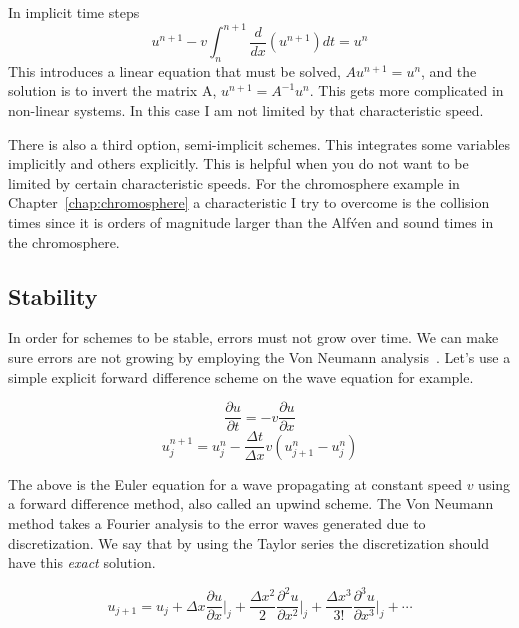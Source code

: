 \documentclass[12pt,upcase]{umlthesis}
\begin{document}
In implicit time steps
\begin{equation}\label{eq:implicit}
	u^{n+1} - v\int^{n+1}_n \frac{d}{dx}(u^{n+1}) dt = u^n 
\end{equation}
This introduces a linear equation that must be solved, $Au^{n+1} = u^n$, and the solution is to invert the matrix A, $u^{n+1} = A^{-1} u^n$. This gets more complicated in non-linear systems. In this case I am not limited by that characteristic speed.

There is also a third option, semi-implicit schemes. This integrates some variables implicitly and others explicitly. This is helpful when you do not want to be limited by certain characteristic speeds. For the chromosphere example in Chapter~\ref{chap:chromosphere} a characteristic I try to overcome is the collision times since it is orders of magnitude larger than the Alf\'ven and sound times in the chromosphere.

\subsection{Stability}\label{sec:stability}

In order for schemes to be stable, errors must not grow over time. We can make sure errors are not growing by employing the Von Neumann analysis~\citep{vonneumann1950}. Let's use a simple explicit forward difference scheme on the wave equation for example.
 
\begin{equation}
	\frac{\partial u}{\partial t} = -v\frac{\partial u}{\partial x}
\end{equation}
\begin{equation}\label{eq:upwind}
	u^{n+1}_j = u^n_j - \frac{\Delta t}{\Delta x}v(u^n_{j+1}-u^n_{j})
\end{equation}

The above is the Euler equation for a wave propagating at constant speed $v$ using a forward difference method, also called an upwind scheme. The Von Neumann method takes a Fourier analysis to the error waves generated due to discretization. We say that by using the Taylor series the discretization should have this {\it exact\/} solution.

\begin{equation}
	u_{j+1} = u_j + \Delta x {\frac{\partial u}{\partial x}}\rvert_j + \frac{\Delta x^2}{2} {\frac{\partial^2 u}{\partial x^2}}\rvert_j + \frac{\Delta x^3}{3!} {\frac{\partial^3 u}{\partial x^3}}\rvert_j + \cdots 
\end{equation}
\end{document}

